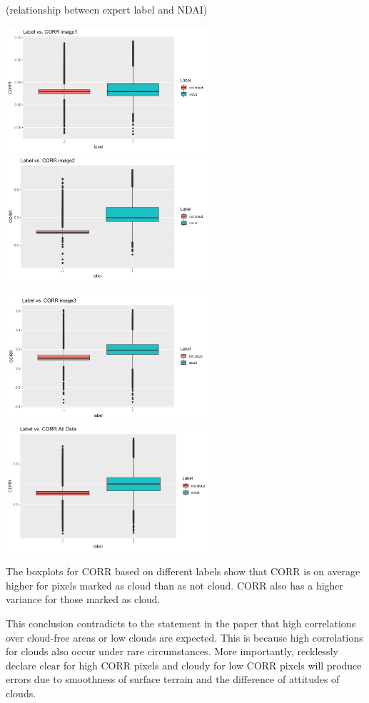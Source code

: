 \documentclass[11pt]{article}
\begin{document}
(relationship between expert label and NDAI)

\includegraphics[width = 7.5cm]{1(c)image4.png}
\includegraphics[width = 7.5cm]{1(c)image5.png}

\includegraphics[width = 7.5cm]{1(c)image6.png}
\includegraphics[width = 7.5cm]{1(c)image7.png}

The boxplots for CORR based on different labels show that CORR is on average higher for pixels marked as cloud than as not cloud. CORR also has a higher variance for those marked as cloud.

This conclusion contradicts to the statement in the paper that high correlations over cloud-free areas or low clouds are expected. This is because high correlations for clouds also occur under rare circumstances. More importantly, recklessly declare clear for high CORR pixels and cloudy for low CORR pixels will produce errors due to smoothness of surface terrain and the difference of attitudes of clouds.
\end{document}

